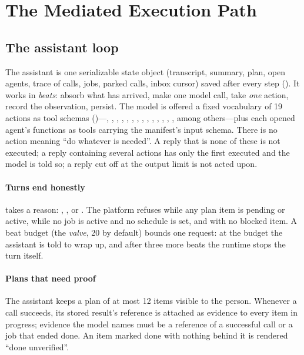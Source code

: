 \section{The Mediated Execution Path}
\label{sec:execution}

\subsection{The assistant loop}

The assistant is one serializable state object (transcript, summary,
plan, open agents, trace of calls, jobs, parked calls, inbox cursor)
saved after every step (). It works in
\emph{beats}: absorb what has arrived, make one model call, take
\emph{one} action, record the observation, persist. The model is offered
a fixed vocabulary of 19 actions as tool schemas
()---, ,
, , , ,
, , , , ,
, , , among others---plus each
opened agent's functions as tools carrying the manifest's input schema.
There is no action meaning ``do whatever is needed''. A reply that is
none of these is not executed; a reply containing several actions has
only the first executed and the model is told so; a reply cut off at
the output limit is not acted upon.

\paragraph{Turns end honestly}
 takes a reason: , ,
 or . The platform refuses
 while any plan item is pending or active,
 while no job is active and no schedule is set,
and  with no blocked item. A beat budget (the
\emph{valve}, 20 by default) bounds one request: at the budget the
assistant is told to wrap up, and after three more beats the runtime
stops the turn itself.

\paragraph{Plans that need proof}
The assistant keeps a plan of at most 12 items visible to the person.
Whenever a call succeeds, its stored result's reference is attached as
evidence to every item in progress; evidence the model names must be a
reference of a successful call or a job that ended done. An item marked
done with nothing behind it is rendered ``done\,\textperiodcentered\,unverified''.

